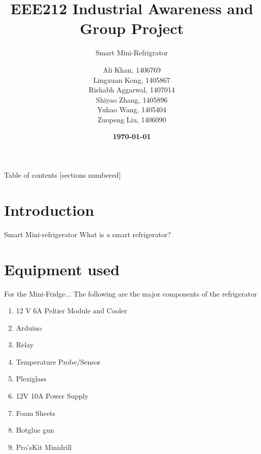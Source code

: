 \documentclass[10pt]{beamer}
\title{EEE212 Industrial Awareness and Group Project}
\subtitle{Smart Mini-Refrigrator}
\date{\bfseries{\today}}
\author{Ali Khan, 1406769\\Lingxuan Kong, 1405867\\Rishabh Aggarwal, 1407014\\Shiyao Zhang, 1405896\\Yuhao Wang, 1405404\\Zuopeng Liu, 1406090}	\institute{\textcolor{red}{\bfseries{Department of Electrical and Electronics Engineering, XJTLU}}}
\begin{document}
\maketitle
{
\begin{frame}{Table of contents}
  [sections numbered]
  \tableofcontents[hideallsubsections]
\end{frame}
}
\section{Introduction}
{
\begin{frame}[fragile]{Smart Mini-refrigerator}
	\Huge{What is a smart refrigerator?}
\end{frame}
}


\section{Equipment used}
{	
	\begin{frame}{For the Mini-Fridge...}
	The following are the major components of the refrigerator
	\begin{enumerate}[<+- | alert@+>]
		\item 12 V 6A Peltier Module and Cooler
		\item Arduino
		\item Relay
		\item Temperature Probe/Sensor
		\item Plexiglass
		\item 12V 10A Power Supply
		\item Foam Sheets
		\item Hotglue gun
		\item Pro'sKit Minidrill
	\end{enumerate}
\end{frame}
}
\end{document}
